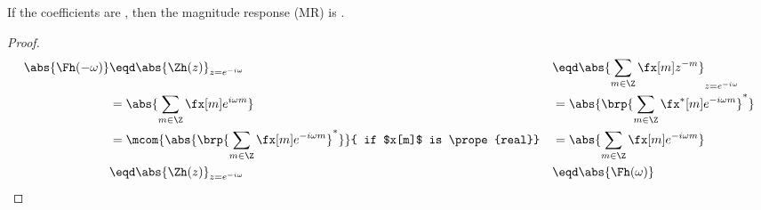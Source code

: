 \begin{proposition}
\label{prop:dtft_real}
If the coefficients are , then the magnitude response (MR) is .
\end{proposition}
\begin{proof}
\begin{align*}
  \abs{\Fh(-\omega)}
    &\eqd \abs{\Zh(z)}_{z=e^{-i\omega}}
   &&\eqd \abs{\sum_{m\in\Z} \fx[m] z^{-m}}_{z=e^{-i\omega}}
  \\&= \abs{\sum_{m\in\Z} \fx[m] e^{i\omega m}}
   &&= \abs{\brp{\sum_{m\in\Z} \fx^\ast[m] e^{-i\omega m}}^\ast}
  \\&= \mcom{\abs{\brp{\sum_{m\in\Z} \fx[m] e^{-i\omega m}}^\ast}}
            { if $x[m]$ is \prope{real}}
   &&= \abs{\sum_{m\in\Z} \fx[m] e^{-i\omega m}}
  \\&\eqd \abs{\Zh(z)}_{z=e^{-i\omega}}
   &&\eqd \abs{\Fh(\omega)}
\end{align*}
\end{proof}



